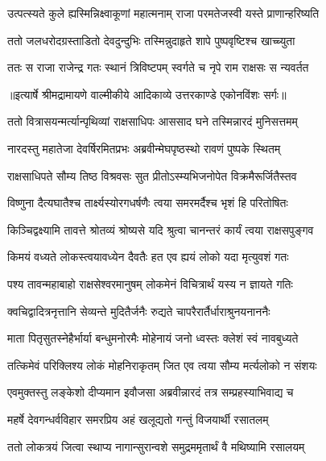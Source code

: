 \twolineshloka
{उत्पत्स्यते कुले ह्यस्मिन्निक्ष्वाकूणां महात्मनाम्}
{राजा परमतेजस्वी यस्ते प्राणान्हरिष्यति} %

\twolineshloka
{ततो जलधरोदग्रस्ताडितो देवदुन्दुभिः}
{तस्मिन्नुदाहृते शापे पुष्पवृष्टिश्च खाच्च्युता} %

\twolineshloka
{ततः स राजा राजेन्द्र गतः स्थानं त्रिविष्टपम्}
{स्वर्गते च नृपे राम राक्षसः स न्यवर्तत} %


{॥इत्यार्षे श्रीमद्रामायणे वाल्मीकीये आदिकाव्ये उत्तरकाण्डे एकोनविंशः सर्गः॥}


\twolineshloka
{ततो वित्रासयन्मर्त्यान्पृथिव्यां राक्षसाधिपः}
{आससाद घने तस्मिन्नारदं मुनिसत्तमम्} %

\twolineshloka
{नारदस्तु महातेजा देवर्षिरमितप्रभः}
{अब्रवीन्मेघपृष्ठस्थो रावणं पुष्पके स्थितम्} %

\twolineshloka
{राक्षसाधिपते सौम्य तिष्ठ विश्रवसः सुत}
{प्रीतोऽस्म्यभिजनोपेत विक्रमैरूर्जितैस्तव} %

\twolineshloka
{विष्णुना दैत्यघातैश्च तार्क्ष्यस्योरगधर्षणैः}
{त्वया समरमर्दैश्च भृशं हि परितोषितः} %

\twolineshloka
{किञ्चिद्वक्ष्यामि तावत्ते श्रोतव्यं श्रोष्यसे यदि}
{श्रुत्वा चानन्तरं कार्यं त्वया राक्षसपुङ्गव} %

\twolineshloka
{किमयं वध्यते लोकस्त्वयावध्येन दैवतैः}
{हत एव ह्ययं लोको यदा मृत्युवशं गतः} %

\twolineshloka
{पश्य तावन्महाबाहो राक्षसेश्वरमानुषम्}
{लोकमेनं विचित्रार्थं यस्य न ज्ञायते गतिः} %

\twolineshloka
{क्वचिद्वादित्रनृत्तानि सेव्यन्ते मुदितैर्जनैः}
{रुद्यते चापरैरार्तैर्धाराश्रुनयनाननैः} %

\twolineshloka
{माता पितृसुतस्नेहैर्भार्या बन्धुमनोरमैः}
{मोहेनायं जनो ध्वस्तः क्लेशं स्वं नावबुध्यते} %

\twolineshloka
{तत्किमेवं परिक्लिश्य लोकं मोहनिराकृतम्}
{जित एव त्वया सौम्य मर्त्यलोको न संशयः} %

\twolineshloka
{एवमुक्तस्तु लङ्केशो दीप्यमान इवौजसा}
{अब्रवीन्नारदं तत्र सम्प्रहस्याभिवाद्य च} %

\twolineshloka
{महर्षे देवगन्धर्वविहार समरप्रिय}
{अहं खलूद्यतो गन्तुं विजयार्थी रसातलम्} %

\twolineshloka
{ततो लोकत्रयं जित्वा स्थाप्य नागान्सुरान्वशे}
{समुद्रममृतार्थं वै मथिष्यामि रसालयम्} %

